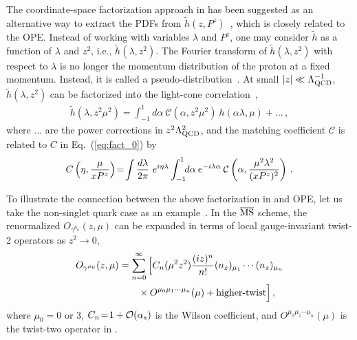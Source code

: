 The coordinate-space factorization approach in \cite{Braun:1994jq} has been
suggested as an alternative way to extract the PDFs from $\tilde h(z, P^z)$~\cite{Radyushkin:2017cyf,Orginos:2017kos,Radyushkin:2019mye}, which is closely related to the OPE.
Instead of working with variables $\lambda$ and $P^z$,
one may consider $\tilde h$ as a function of $\lambda$ and $z^2$, i.e.,
$\tilde h(\lambda, z^2)$. The Fourier transform
of $\tilde h(\lambda, z^2)$ with respect to $\lambda$ is no longer the momentum
distribution of the proton at a fixed momentum. Instead, it is called a pseudo-distribution~\cite{Radyushkin:2017cyf}.
At small $|z|\ll \Lambda^{-1}_{\rm QCD}$, $\tilde h(\lambda, z^2)$ can be factorized into the light-cone correlation~\cite{Radyushkin:2017lvu,Izubuchi:2018srq},
\begin{align}
	\label{eq:io-Q-fact}
	\tilde{h}(\lambda, z^2\mu^2)
	=\int_{-1}^1 d\alpha\ \mathcal{C}(\alpha, z^2\mu^2)\ h(\alpha\lambda,\mu) +...\,,
\end{align}
where $...$ are the power corrections in $z^2\Lambda^2_{\rm QCD}$,
and the matching coefficient $\mathcal{C}$
is related to $C$ in Eq.~(\ref{eq:fact_0}) by
\begin{align} \label{eq:ftc-C}
	C\left(\eta,{\mu\over xP^z}\right)
	\!= \!\int {d\lambda\over 2\pi}\ e^{i\eta\lambda}\int_{-1}^1\!\! d\alpha\: e^{-i\lambda\alpha}\: \mathcal{C}\left(\alpha,{\mu^2 \lambda^2\over (xP^z)^2}\right)\,.
\end{align}

To illustrate the connection between the above factorization in  and OPE,
let us take the non-singlet quark case as an example~\cite{Izubuchi:2018srq,Wang:2019tgg}. In the ${\overline{\rm MS}}$ scheme, the renormalized $O_{\gamma^{\mu_0}}(z,\mu)$ can be expanded in terms of local gauge-invariant twist-2 operators as $z^2\to 0$,
\begin{align}\label{eq:ope-tq}
	O_{\gamma^{\mu_0}}(z,\mu) &=\sum_{n=0}^\infty \Big[C_n ({\mu}^2 z^2)\frac{(iz)^n}{n!} (n_z)_{\mu_1}\cdots (n_z)_{\mu_n} \nonumber\\
	&\qquad \times O^{\mu_0\mu_1\cdots\mu_n}(\mu) +  \text{higher-twist}\Big]\,,
\end{align}
where $\mu_0\!=\!0$ or $3$, $C_n\!=\!1+{\cal O}(\alpha_s)$ is the Wilson coefficient, and $O^{\mu_0\mu_1\cdots\mu_n}(\mu)$
is the twist-two operator in .

